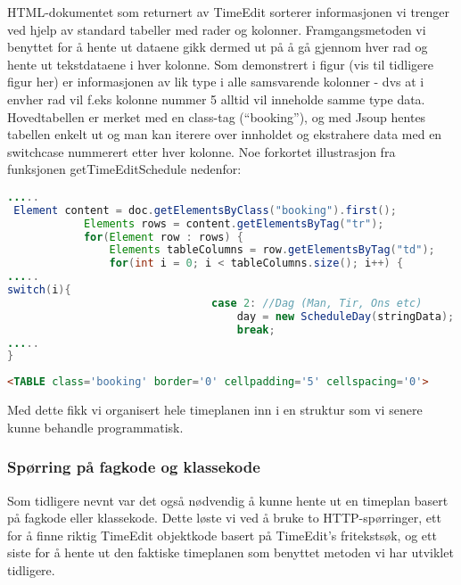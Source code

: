 \documentclass[../main.tex]{subfiles}
\begin{document}
HTML-dokumentet som returnert av TimeEdit sorterer informasjonen vi trenger ved hjelp av standard tabeller med rader og kolonner. Framgangsmetoden vi benyttet for å hente ut dataene gikk dermed ut på å gå gjennom hver rad og hente ut tekstdataene i hver kolonne. Som demonstrert i figur (vis til tidligere figur her) er informasjonen av lik type i alle samsvarende kolonner - dvs at i envher rad vil f.eks kolonne nummer 5 alltid vil inneholde samme type data.
Hovedtabellen er merket med en class-tag (“booking”), og med Jsoup hentes tabellen enkelt ut og man kan iterere over innholdet og ekstrahere data med en switchcase nummerert etter hver kolonne. Noe forkortet illustrasjon fra funksjonen getTimeEditSchedule nedenfor:

\begin{lstlisting}[language=Java, frame=single, caption={asdasdsadasdasdasdsadsadasdasdsadsa}]
.....
 Element content = doc.getElementsByClass("booking").first();
            Elements rows = content.getElementsByTag("tr");
            for(Element row : rows) {
                Elements tableColumns = row.getElementsByTag("td");
                for(int i = 0; i < tableColumns.size(); i++) {
.....
switch(i){
                                case 2: //Dag (Man, Tir, Ons etc)
                                    day = new ScheduleDay(stringData);
                                    break;
.....
}
\end{lstlisting}

\begin{lstlisting}[language=HTML, frame=single, caption={asdasdsadasdasdasdsadsadasdasdsadsa}]
<TABLE class='booking' border='0' cellpadding='5' cellspacing='0'>
\end{lstlisting}

Med dette fikk vi organisert hele timeplanen inn i en struktur som vi senere kunne behandle programmatisk.  

\subsubsection{Spørring på fagkode og klassekode}

Som tidligere nevnt var det også nødvendig å kunne hente ut en timeplan basert på fagkode eller klassekode. Dette løste vi ved å bruke to HTTP-spørringer, ett for å finne riktig TimeEdit objektkode basert på TimeEdit’s fritekstsøk, og ett siste for å hente ut den faktiske timeplanen som benyttet metoden vi har utviklet tidligere.
\end{document}
